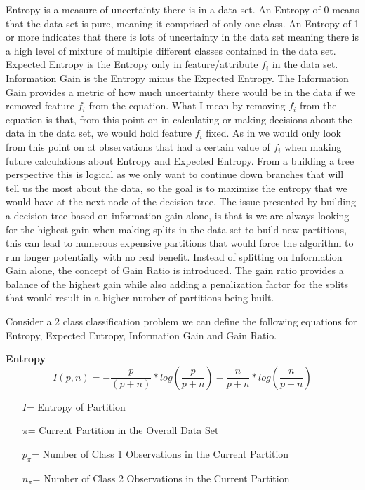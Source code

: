 \documentclass[twoside,11pt]{article}
\begin{document}
Entropy is a measure of uncertainty there is in a data set. An Entropy of 0 means that the data set is pure, meaning it comprised of only one class. An Entropy of 1 or more indicates that there is lots of uncertainty in the data set meaning there is a high level of mixture of multiple different classes contained in the data set.\newline
Expected Entropy is the Entropy only in feature/attribute $f_i$ in the data set.\newline
Information Gain is the Entropy minus the Expected Entropy. The Information Gain provides a metric of how much uncertainty there would be in the data if we removed feature $f_i$ from the equation. What I mean by removing $f_i$ from the equation is that, from this point on in calculating or making decisions about the data in the data set, we would hold feature $f_i$ fixed. As in we would only look from this point on at observations that had a certain value of $f_i$ when making future calculations about Entropy and Expected Entropy. From a building a tree perspective this is logical as we only want to continue down branches that will tell us the most about the data, so the goal is to maximize the entropy that we would have at the next node of the decision tree.\newline
The issue presented by building a decision tree based on information gain alone, is that is we are always looking for the highest gain when making splits in the data set to build new partitions, this can lead to numerous expensive partitions that would force the algorithm to run longer potentially with no real benefit. Instead of splitting on Information Gain alone, the concept of Gain Ratio is introduced. The gain ratio provides a balance of the highest gain while also adding a penalization factor for the splits that would result in a higher number of partitions being built.
\newpage

Consider a 2 class classification problem we can define the following equations for Entropy, Expected Entropy, Information Gain and Gain Ratio.\newline

\textbf{Entropy}
\begin{equation}
I(p,n) = -\frac{p}{(p+n)} * log(\frac{p}{p+n}) - \frac{n}{p+n} * log(\frac{n}{p+n})
\end{equation}
\begin{itemize}
	\item[$I$=] Entropy of Partition
	\item[$\pi$=] Current Partition in the Overall Data Set
	\item[$p_\pi$=] Number of Class 1 Observations in the Current Partition
	\item[$n_\pi$=] Number of Class 2 Observations in the Current Partition
\end{itemize}
\end{document}
